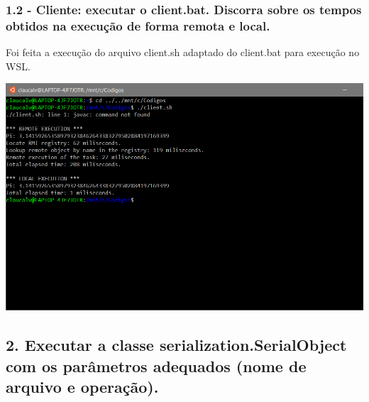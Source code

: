 \subsubsection{1.2 - Cliente: executar o client.bat. Discorra sobre os tempos obtidos na
execução de forma remota e local.}

Foi feita a execução do arquivo client.sh adaptado do client.bat para execução no WSL.

\vspace{2em}
\begin{minipage}{\textwidth}
    \hspace{-1em}
    \centering
    \includegraphics[trim= 0 150 250 0, clip, scale=.4]{prints/client.PNG}
    \label{threadspng}
    \hspace{1em}
\end{minipage}
\vspace{0.5em}


\subsection*{2. Executar a classe serialization.SerialObject com os parâmetros adequados (nome de arquivo e operação).}



